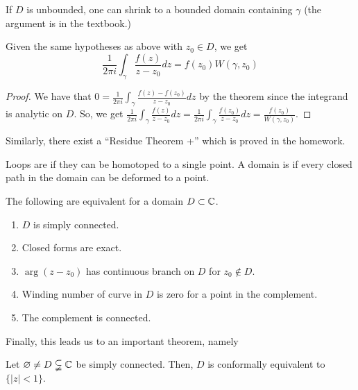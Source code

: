 \documentclass[11pt,leqno,oneside]{amsart}
\numberwithin{thm}{section}
\begin{document}
  If $D$ is unbounded, one can shrink to a bounded domain containing
  $\gamma$ (the argument is in the textbook.)
  \begin{cor}
    Given the same hypotheses as above with $z_0 \in D$, we get \[
      \frac{1}{2\pi i}\int_\gamma \frac{f(z)}{z-z_0}dz = f(z_0)W(\gamma,z_0)
    \]
  \end{cor}
  \begin{proof}
    We have that $0 = \frac{1}{2\pi i} \int_\gamma
    \frac{f(z)-f(z_0)}{z-z_0}dz$ by the theorem since the integrand is
    analytic on $D$. So, we get $\frac{1}{2\pi i} \int_\gamma
    \frac{f(z)}{z-z_0}dz = \frac{1}{2\pi i} \int_\gamma
    \frac{f(z_0)}{z-z_0} dz = \frac{f(z_0)}{W(\gamma,z_0)}$.
  \end{proof}
  Similarly, there exist a ``Residue Theorem +'' which is proved in
  the homework.
  \begin{defn}
    Loops are  if they can be homotoped to a single
    point. A domain is  if every closed path in
    the domain can be deformed to a point.
  \end{defn}
  \begin{thm}
    The following are equivalent for a domain $D \subset {\mathbb C}$.
    \begin{enumerate}
    \item $D$ is simply connected.
    \item Closed forms are exact.
    \item $\arg(z-z_0)$ has continuous branch on $D$ for $z_0 \not \in
      D$.
    \item Winding number of curve in $D$ is zero for a point in the
      complement.
    \item The complement is connected.
    \end{enumerate}
  \end{thm}
  Finally, this leads us to an important theorem, namely
  \begin{thm}
    Let $\varnothing \neq D \subsetneqq {\mathbb C}$ be simply connected. Then,
    $D$ is conformally equivalent to $\{|z| < 1\}.$
  \end{thm}
\end{document}
